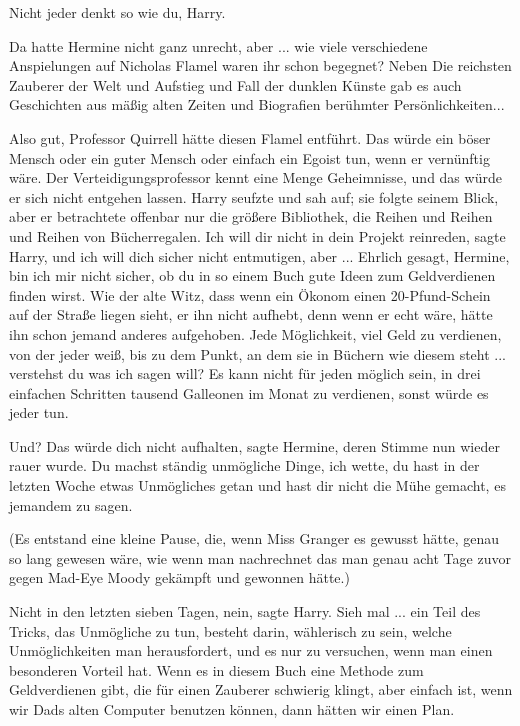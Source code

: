 \glqq{}Nicht jeder denkt so wie du, Harry.\grqq{}

Da hatte Hermine nicht ganz unrecht, aber ... wie viele verschiedene
Anspielungen auf Nicholas Flamel waren ihr schon begegnet? Neben \glqq{}Die
reichsten Zauberer der Welt\grqq{} und \glqq{}Aufstieg und Fall der dunklen
Künste\grqq{} gab es auch \glqq{}Geschichten aus mäßig alten Zeiten\grqq{} und
\glqq{}Biografien berühmter Persönlichkeiten\grqq{}...

\glqq{}Also gut, Professor Quirrell hätte diesen Flamel entführt. Das würde ein
böser Mensch oder ein guter Mensch oder einfach ein Egoist tun, wenn er
vernünftig wäre. Der Verteidigungsprofessor kennt eine Menge Geheimnisse, und
das würde er sich nicht entgehen lassen.\grqq{} Harry seufzte und sah auf; sie
folgte seinem Blick, aber er betrachtete offenbar nur die größere Bibliothek,
die Reihen und Reihen und Reihen von Bücherregalen. \glqq{}Ich will dir nicht in
dein Projekt reinreden\grqq{}, sagte Harry, \glqq{}und ich will dich sicher nicht
entmutigen, aber ... Ehrlich gesagt, Hermine, bin ich mir nicht sicher, ob du in
so einem Buch gute Ideen zum Geldverdienen finden wirst. Wie der alte Witz, dass
wenn ein Ökonom einen 20-Pfund-Schein auf der Straße liegen sieht, er ihn nicht
aufhebt, denn wenn er echt wäre, hätte ihn schon jemand anderes aufgehoben. Jede
Möglichkeit, viel Geld zu verdienen, von der jeder weiß, bis zu dem Punkt, an
dem sie in Büchern wie diesem steht ... verstehst du was ich sagen will? Es kann
nicht für jeden möglich sein, in drei einfachen Schritten tausend Galleonen im
Monat zu verdienen, sonst würde es jeder tun.\grqq{}

\glqq{}Und? Das würde dich nicht aufhalten\grqq{}, sagte Hermine, deren Stimme
nun wieder rauer wurde. \glqq{}Du machst ständig unmögliche Dinge, ich wette, du
hast in der letzten Woche etwas Unmögliches getan und hast dir nicht die Mühe
gemacht, es jemandem zu sagen.\grqq{}

(Es entstand eine kleine Pause, die, wenn Miss Granger es gewusst hätte, genau
so lang gewesen wäre, wie wenn man nachrechnet das man genau acht Tage zuvor
gegen Mad-Eye Moody gekämpft und gewonnen hätte.)

\glqq{}Nicht in den letzten sieben Tagen, nein\grqq{}, sagte Harry. \glqq{}Sieh
mal ... ein Teil des Tricks, das Unmögliche zu tun, besteht darin, wählerisch zu
sein, welche Unmöglichkeiten man herausfordert, und es nur zu versuchen, wenn
man einen besonderen Vorteil hat. Wenn es in diesem Buch eine Methode zum
Geldverdienen gibt, die für einen Zauberer schwierig klingt, aber einfach ist,
wenn wir Dads alten Computer benutzen können, dann hätten wir einen Plan.\grqq{}


